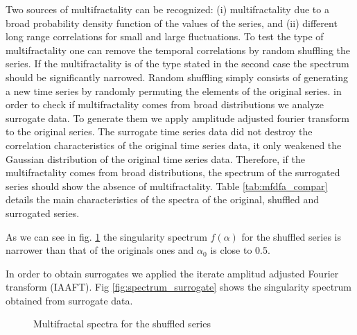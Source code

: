 \documentclass[onecolumn, preprint,aps,amsmath, amssymb, superscriptaddress]{revtex4}
\begin{document}
Two sources of multifractality can be recognized: (i) multifractality due to a broad probability density function of the values of the series, and (ii) different long range correlations for small and large fluctuations. To test the type of multifractality one can remove the temporal correlations by random shuffling the series. If the multifractality is of the type stated in the second case the spectrum should be significantly narrowed. Random shuffling simply consists of generating a new time series by randomly permuting the elements of the original series. in order to check if multifractality comes from broad distributions we analyze surrogate data. To generate them we apply amplitude adjusted fourier transform to the original series. The surrogate time series data did not destroy the correlation characteristics of the original time series data, it only weakened the Gaussian distribution of the original time series data. Therefore, if the multifractality comes from broad distributions, the spectrum of the surrogated series should show the absence of multifractality. Table \ref{tab:mfdfa_compar} details the main characteristics of the spectra of the original, shuffled and surrogated series.

As we can see in fig. \ref{fig:spectrum_shuffle} the singularity spectrum $f(\alpha)$ for the shuffled series is narrower than that of the originals ones and $\alpha_0$ is close to 0.5. 

In order to obtain surrogates we applied the iterate amplitud adjusted Fourier transform (IAAFT). Fig \ref{fig:spectrum_surrogate} shows the singularity spectrum obtained from surrogate data. 


\begin{figure}
\caption{Multifractal spectra for the shuffled series}
\label{fig:spectrum_shuffle}
\end{figure}
\end{document}
